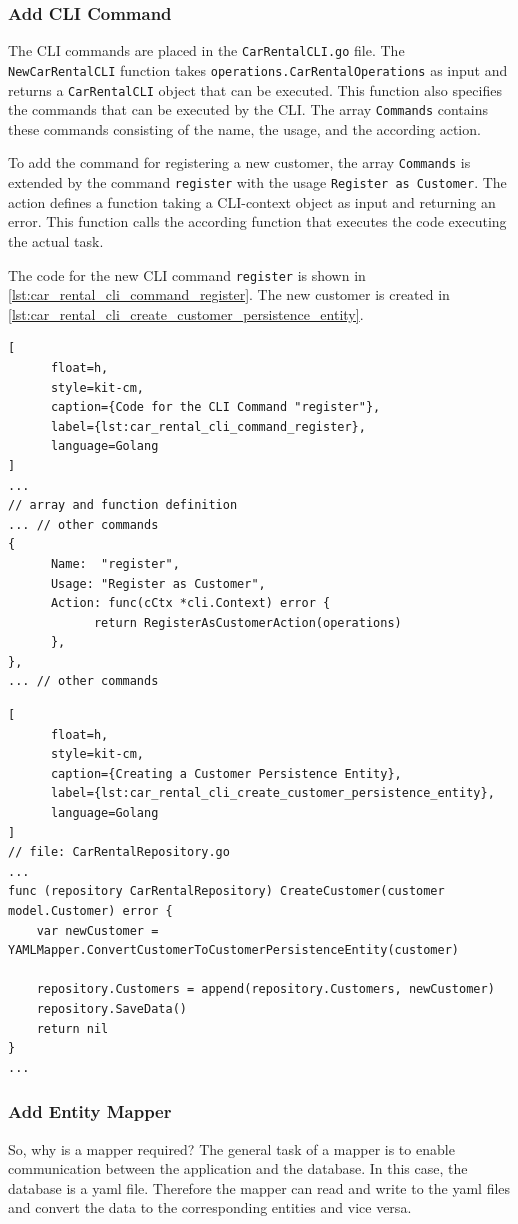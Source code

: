 \subsubsection*{Add CLI Command}
The CLI commands are placed in the \texttt{CarRentalCLI.go} file.
The \texttt{NewCarRentalCLI} function takes \texttt{operations.CarRentalOperations} as input and returns a \texttt{CarRentalCLI} object that can be executed.
This function also specifies the commands that can be executed by the CLI.
The array \texttt{Commands} contains these commands consisting of the name, the usage, and the according action.

To add the command for registering a new customer, the array \texttt{Commands} is extended by the command \texttt{register} with the usage \texttt{Register as Customer}.
The action defines a function taking a CLI-context object as input and returning an error.
This function calls the according function that executes the code executing the actual task.

The code for the new CLI command \texttt{register} is shown in \autoref{lst:car_rental_cli_command_register}.
The new customer is created in \autoref{lst:car_rental_cli_create_customer_persistence_entity}.

\begin{lstlisting}[
      float=h,
      style=kit-cm,
      caption={Code for the CLI Command "register"},
      label={lst:car_rental_cli_command_register},
      language=Golang
]
...
// array and function definition
... // other commands
{
      Name:  "register",
      Usage: "Register as Customer",
      Action: func(cCtx *cli.Context) error {
            return RegisterAsCustomerAction(operations)
      },
},
... // other commands
\end{lstlisting}

\begin{lstlisting}[
      float=h,
      style=kit-cm,
      caption={Creating a Customer Persistence Entity},
      label={lst:car_rental_cli_create_customer_persistence_entity},
      language=Golang
]
// file: CarRentalRepository.go
...
func (repository CarRentalRepository) CreateCustomer(customer model.Customer) error {
	var newCustomer = YAMLMapper.ConvertCustomerToCustomerPersistenceEntity(customer)

	repository.Customers = append(repository.Customers, newCustomer)
	repository.SaveData()
	return nil
}
...
\end{lstlisting}

\subsubsection*{Add Entity Mapper}
So, why is a mapper required?
The general task of a mapper is to enable communication between the application and the database.
In this case, the database is a yaml file.
Therefore the mapper can read and write to the yaml files and convert the data to the corresponding entities and vice versa.

